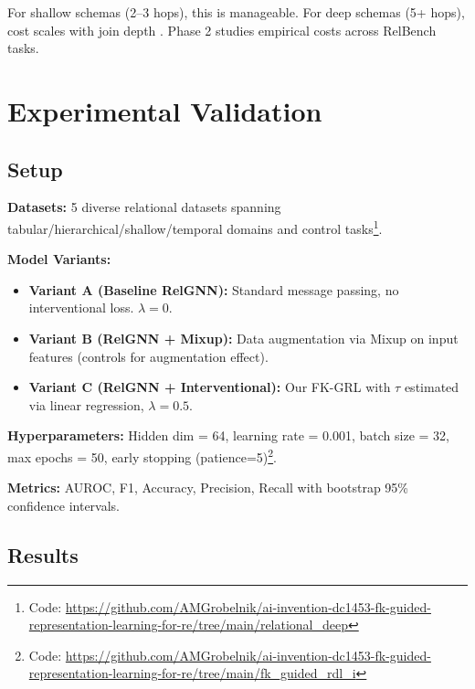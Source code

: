 \documentclass[11pt,letterpaper]{article}
\begin{document}
For shallow schemas (2--3 hops), this is manageable. For deep schemas (5+ hops), cost scales with join depth \cite{Li2023}. Phase 2 studies empirical costs across RelBench tasks.

\section{Experimental Validation}

\subsection{Setup}

\textbf{Datasets:} 5 diverse relational datasets spanning tabular/hierarchical/shallow/temporal domains and control tasks\footnote{Code: \url{https://github.com/AMGrobelnik/ai-invention-dc1453-fk-guided-representation-learning-for-re/tree/main/relational_deep}}.

\textbf{Model Variants:}
\begin{itemize}
\item \textbf{Variant A (Baseline RelGNN):} Standard message passing, no interventional loss. $\lambda = 0$.
\item \textbf{Variant B (RelGNN + Mixup):} Data augmentation via Mixup \cite{Zhang2018} on input features (controls for augmentation effect).
\item \textbf{Variant C (RelGNN + Interventional):} Our FK-GRL with $\tau$ estimated via linear regression, $\lambda = 0.5$.
\end{itemize}

\textbf{Hyperparameters:} Hidden dim = 64, learning rate = 0.001, batch size = 32, max epochs = 50, early stopping (patience=5)\footnote{Code: \url{https://github.com/AMGrobelnik/ai-invention-dc1453-fk-guided-representation-learning-for-re/tree/main/fk_guided_rdl_i}}.

\textbf{Metrics:} AUROC, F1, Accuracy, Precision, Recall with bootstrap 95\% confidence intervals.

\subsection{Results}
\end{document}
